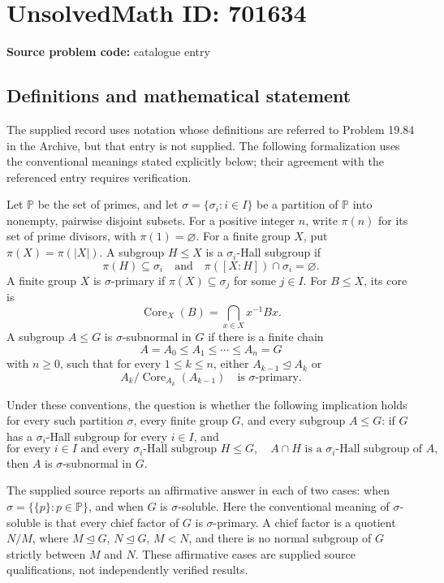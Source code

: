 \documentclass[11pt]{article}
\begin{document}
\section*{UnsolvedMath ID: 701634}
\textbf{Source problem code:} catalogue entry
\subsection{Definitions and mathematical statement}
The supplied record uses notation whose definitions are referred to Problem 19.84 in the Archive, but that entry is not supplied. The following formalization uses the conventional meanings stated explicitly below; their agreement with the referenced entry requires verification.

Let \(\mathbb P\) be the set of primes, and let \(\sigma=\{\sigma_i:i\in I\}\) be a partition of \(\mathbb P\) into nonempty, pairwise disjoint subsets. For a positive integer \(n\), write \(\pi(n)\) for its set of prime divisors, with \(\pi(1)=\varnothing\). For a finite group \(X\), put \(\pi(X)=\pi(|X|)\). A subgroup \(H\leq X\) is a \(\sigma_i\)-Hall subgroup if
\[
\pi(H)\subseteq\sigma_i
\quad\text{and}\quad
\pi([X:H])\cap\sigma_i=\varnothing.
\]
A finite group \(X\) is \(\sigma\)-primary if \(\pi(X)\subseteq\sigma_j\) for some \(j\in I\). For \(B\leq X\), its core is
\[
\operatorname{Core}_X(B)=\bigcap_{x\in X}x^{-1}Bx.
\]
A subgroup \(A\leq G\) is \(\sigma\)-subnormal in \(G\) if there is a finite chain
\[
A=A_0\leq A_1\leq\cdots\leq A_n=G
\]
with \(n\geq0\), such that for every \(1\leq k\leq n\), either \(A_{k-1}\trianglelefteq A_k\) or
\[
A_k/\operatorname{Core}_{A_k}(A_{k-1})
\quad\text{is }\sigma\text{-primary}.
\]

Under these conventions, the question is whether the following implication holds for every such partition \(\sigma\), every finite group \(G\), and every subgroup \(A\leq G\): if \(G\) has a \(\sigma_i\)-Hall subgroup for every \(i\in I\), and
\[
\text{for every }i\in I\text{ and every }\sigma_i\text{-Hall subgroup }H\leq G,
\quad A\cap H\text{ is a }\sigma_i\text{-Hall subgroup of }A,
\]
then \(A\) is \(\sigma\)-subnormal in \(G\).

The supplied source reports an affirmative answer in each of two cases: when \(\sigma=\{\{p\}:p\in\mathbb P\}\), and when \(G\) is \(\sigma\)-soluble. Here the conventional meaning of \(\sigma\)-soluble is that every chief factor of \(G\) is \(\sigma\)-primary. A chief factor is a quotient \(N/M\), where \(M\trianglelefteq G\), \(N\trianglelefteq G\), \(M<N\), and there is no normal subgroup of \(G\) strictly between \(M\) and \(N\). These affirmative cases are supplied source qualifications, not independently verified results.
\end{document}
